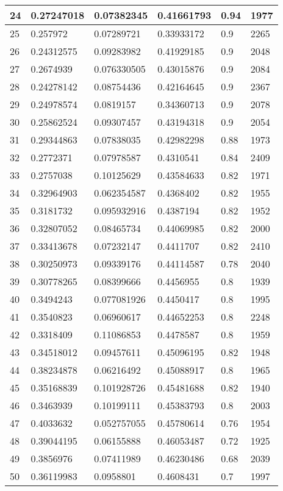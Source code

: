 \begin{longtable}{|l|l|l|l|l|l|}
24 & 0.27247018 & 0.07382345 & 0.41661793 & 0.94 & 1977 \\ \hline 
25 & 0.257972 & 0.07289721 & 0.33933172 & 0.9 & 2265 \\ \hline 
26 & 0.24312575 & 0.09283982 & 0.41929185 & 0.9 & 2048 \\ \hline 
27 & 0.2674939 & 0.076330505 & 0.43015876 & 0.9 & 2084 \\ \hline 
28 & 0.24278142 & 0.08754436 & 0.42164645 & 0.9 & 2367 \\ \hline 
29 & 0.24978574 & 0.0819157 & 0.34360713 & 0.9 & 2078 \\ \hline 
30 & 0.25862524 & 0.09307457 & 0.43194318 & 0.9 & 2054 \\ \hline 
31 & 0.29344863 & 0.07838035 & 0.42982298 & 0.88 & 1973 \\ \hline 
32 & 0.2772371 & 0.07978587 & 0.4310541 & 0.84 & 2409 \\ \hline 
33 & 0.2757038 & 0.10125629 & 0.43584633 & 0.82 & 1971 \\ \hline 
34 & 0.32964903 & 0.062354587 & 0.4368402 & 0.82 & 1955 \\ \hline 
35 & 0.3181732 & 0.095932916 & 0.4387194 & 0.82 & 1952 \\ \hline 
36 & 0.32807052 & 0.08465734 & 0.44069985 & 0.82 & 2000 \\ \hline 
37 & 0.33413678 & 0.07232147 & 0.4411707 & 0.82 & 2410 \\ \hline 
38 & 0.30250973 & 0.09339176 & 0.44114587 & 0.78 & 2040 \\ \hline 
39 & 0.30778265 & 0.08399666 & 0.4456955 & 0.8 & 1939 \\ \hline 
40 & 0.3494243 & 0.077081926 & 0.4450417 & 0.8 & 1995 \\ \hline 
41 & 0.3540823 & 0.06960617 & 0.44652253 & 0.8 & 2248 \\ \hline 
42 & 0.3318409 & 0.11086853 & 0.4478587 & 0.8 & 1959 \\ \hline 
43 & 0.34518012 & 0.09457611 & 0.45096195 & 0.82 & 1948 \\ \hline 
44 & 0.38234878 & 0.06216492 & 0.45088917 & 0.8 & 1965 \\ \hline 
45 & 0.35168839 & 0.101928726 & 0.45481688 & 0.82 & 1940 \\ \hline 
46 & 0.3463939 & 0.10199111 & 0.45383793 & 0.8 & 2003 \\ \hline 
47 & 0.4033632 & 0.052757055 & 0.45780614 & 0.76 & 1954 \\ \hline 
48 & 0.39044195 & 0.06155888 & 0.46053487 & 0.72 & 1925 \\ \hline 
49 & 0.3856976 & 0.07411989 & 0.46230486 & 0.68 & 2039 \\ \hline 
50 & 0.36119983 & 0.0958801 & 0.4608431 & 0.7 & 1997 \\ \hline 
\end{longtable}